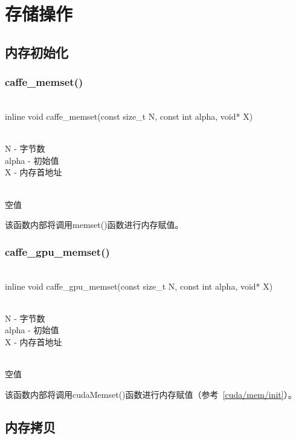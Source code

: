 \section{存储操作}
\subsection{内存初始化}\label{math/mem/init}
\subsubsection{caffe\_memset()}
\begin{cnfrmfunc}
   \item{}\\
     inline void caffe\_memset(const size\_t N, const int alpha, void* X)
   \item{}\\
     N - 字节数\\
     alpha - 初始值\\
     X - 内存首地址
   \item{}\\
     空值
\end{cnfrmfunc}
该函数内部将调用memset()函数进行内存赋值。
\subsubsection{caffe\_gpu\_memset()}
\begin{cnfrmfunc}
   \item{}\\
     inline void caffe\_gpu\_memset(const size\_t N, const int alpha, void* X)
   \item{}\\
     N - 字节数\\
     alpha - 初始值\\
     X - 内存首地址
   \item{}\\
     空值
\end{cnfrmfunc}
该函数内部将调用cudaMemset()函数进行内存赋值（参考~\ref{cuda/mem/init}）。
\subsection{内存拷贝}\label{math/mem/cpy}
